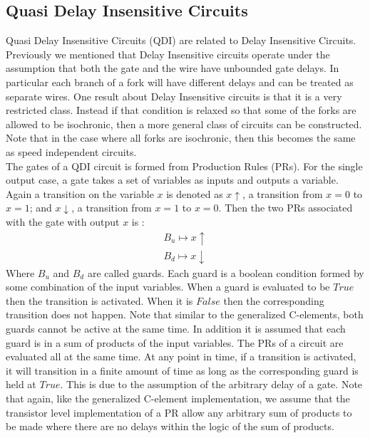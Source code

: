 \documentclass[12pt]{report}
\begin{document}
 
 \subsection{Quasi Delay Insensitive Circuits}
Quasi Delay Insensitive Circuits (QDI) are related to Delay Insensitive Circuits.  Previously we mentioned that Delay Insensitive circuits operate under the assumption that both the gate and the wire have unbounded gate delays.  In particular each branch of a fork will have different delays and can be treated as separate wires.  One result about Delay Insensitive circuits is that it is a very restricted class.  Instead if that condition is relaxed so that some of the forks are allowed to be isochronic, then a more general class of circuits can be constructed.  Note that in the case where all forks are isochronic, then this becomes the same as speed independent circuits.  \\
 
The gates of a QDI circuit is formed from Production Rules (PRs).  For the single output case, a gate takes a set of variables as inputs and outputs a variable.  Again a transition on the variable $x$ is denoted as $x\uparrow$, a transition from $x=0$ to $x=1$; and $x\downarrow$, a transition from $x=1$ to $x=0$.  Then the two PRs associated with the gate with output $x$ is :
\begin{align*}
   B_u\mapsto x\uparrow \\
   B_d\mapsto x\downarrow 
\end{align*}
Where $B_u$ and $B_d$ are called guards.  Each guard is a boolean condition formed by some combination of the input variables.  When a guard is evaluated to be $True$ then the transition is activated.  When it is $False$ then the corresponding transition does not happen.  Note that similar to the generalized C-elements, both guards cannot be active at the same time.  In addition it is assumed that each guard is in a sum of products of the input variables.  The PRs of a circuit are evaluated all at the same time.  At any point in time, if a transition is activated, it will transition in a finite amount of time as long as the corresponding guard is held at $True$.  This is due to the assumption of the arbitrary delay of a gate.  Note that again, like the generalized C-element implementation, we assume that the transistor level implementation of a PR allow any arbitrary sum of products to be made where there are no delays within the logic of the sum of products.\\
\end{document}
